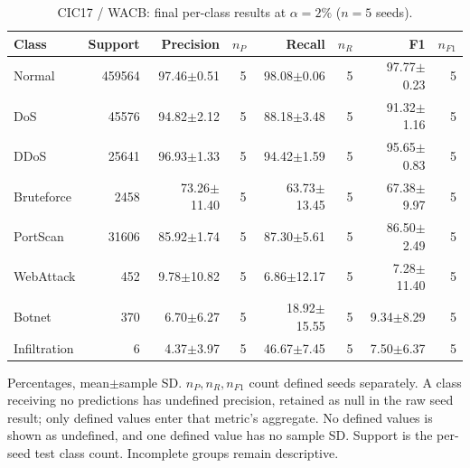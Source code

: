 \begin{table}[t]
\centering\scriptsize
\setlength{\tabcolsep}{3.3pt}
\caption{CIC17 / WACB: final per-class results at $\alpha=2\%$ ($n=5$ seeds).}\label{tab:forgetting-class-cic_ids_2017-wacb}
\begin{tabular}{lrrrrrrr}
\toprule
Class & Support & Precision & $n_P$ & Recall & $n_R$ & F1 & $n_{F1}$ \\
\midrule
Normal & 459564 & 97.46$\pm$0.51 & 5 & 98.08$\pm$0.06 & 5 & 97.77$\pm$0.23 & 5 \\
DoS & 45576 & 94.82$\pm$2.12 & 5 & 88.18$\pm$3.48 & 5 & 91.32$\pm$1.16 & 5 \\
DDoS & 25641 & 96.93$\pm$1.33 & 5 & 94.42$\pm$1.59 & 5 & 95.65$\pm$0.83 & 5 \\
Bruteforce & 2458 & 73.26$\pm$11.40 & 5 & 63.73$\pm$13.45 & 5 & 67.38$\pm$9.97 & 5 \\
PortScan & 31606 & 85.92$\pm$1.74 & 5 & 87.30$\pm$5.61 & 5 & 86.50$\pm$2.49 & 5 \\
WebAttack & 452 & 9.78$\pm$10.82 & 5 & 6.86$\pm$12.17 & 5 & 7.28$\pm$11.40 & 5 \\
Botnet & 370 & 6.70$\pm$6.27 & 5 & 18.92$\pm$15.55 & 5 & 9.34$\pm$8.29 & 5 \\
Infiltration & 6 & 4.37$\pm$3.97 & 5 & 46.67$\pm$7.45 & 5 & 7.50$\pm$6.37 & 5 \\
\bottomrule
\end{tabular}
\par\smallskip\begin{minipage}{0.98\textwidth}\scriptsize Percentages, mean$\pm$sample SD. $n_P,n_R,n_{F1}$ count defined seeds separately. A class receiving no predictions has undefined precision, retained as null in the raw seed result; only defined values enter that metric's aggregate. No defined values is shown as undefined, and one defined value has no sample SD. Support is the per-seed test class count. Incomplete groups remain descriptive.\end{minipage}
\end{table}

